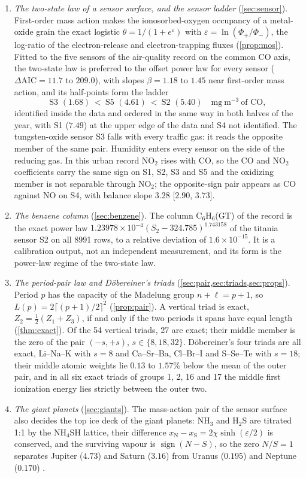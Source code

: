 \documentclass[11pt]{article}
\theoremstyle{definition}\newtheorem{definition}[theorem]{Definition}
\theoremstyle{remark}\newtheorem{remark}[theorem]{Remark}
\begin{document}
\begin{enumerate}[label=(\arabic*)]
\item \emph{The two-state law of a sensor surface, and the sensor ladder} (\cref{sec:sensor}). First-order mass action makes the ionosorbed-oxygen occupancy of a metal-oxide grain the exact logistic $\theta=1/(1+e^{\varepsilon})$ with $\varepsilon=\ln(\Phi_+/\Phi_-)$, the log-ratio of the electron-release and electron-trapping fluxes (\cref{prop:mos}). Fitted to the five sensors of the air-quality record on the common CO axis, the two-state law is preferred to the offset power law for every sensor ($\Delta\mathrm{AIC}=11.7$ to $209.0$), with slopes $\beta=1.18$ to $1.45$ near first-order mass action, and its half-points form the ladder
\[
\text{S3 }(1.68)\ <\ \text{S5 }(4.61)\ <\ \text{S2 }(5.40)\quad\mathrm{mg\ m^{-3}}\ \text{of CO},
\]
identified inside the data and ordered in the same way in both halves of the year, with S1 ($7.49$) at the upper edge of the data and S4 not identified. The tungsten-oxide sensor S3 falls with every traffic gas: it reads the opposite member of the same pair. Humidity enters every sensor on the side of the reducing gas. In this urban record NO$_2$ rises with CO, so the CO and NO$_2$ coefficients carry the same sign on S1, S2, S3 and S5 and the oxidizing member is not separable through NO$_2$; the opposite-sign pair appears as CO against NO on S4, with balance slope $3.28$ [$2.90$, $3.73$].
\item \emph{The benzene column} (\cref{sec:benzene}). The column C$_6$H$_6$(GT) of the record is the exact power law $1.23978\times10^{-4}(S_2-324.785)^{1.743158}$ of the titania sensor S2 on all 8991 rows, to a relative deviation of $1.6\times10^{-15}$. It is a calibration output, not an independent measurement, and its form is the power-law regime of the two-state law.
\item \emph{The period-pair law and D\"obereiner's triads} (\cref{sec:pair,sec:triads,sec:props}). Period $p$ has the capacity of the Madelung group $n+\ell=p+1$, so $L(p)=2\lceil(p+1)/2\rceil^2$ (\cref{prop:pair}). A vertical triad is exact, $Z_2=\frac12(Z_1+Z_3)$, if and only if the two periods it spans have equal length (\cref{thm:exact}). Of the 54 vertical triads, 27 are exact; their middle member is the zero of the pair $(-s,+s)$, $s\in\{8,18,32\}$. D\"obereiner's four triads are all exact, Li--Na--K with $s=8$ and Ca--Sr--Ba, Cl--Br--I and S--Se--Te with $s=18$; their middle atomic weights lie $0.13$ to $1.57\%$ below the mean of the outer pair, and in all six exact triads of groups 1, 2, 16 and 17 the middle first ionization energy lies strictly between the outer two.
\item \emph{The giant planets} (\cref{sec:giants}). The mass-action pair of the sensor surface also decides the top ice deck of the giant planets: NH$_3$ and H$_2$S are titrated 1:1 by the NH$_4$SH lattice, their difference $x_{\mathrm N}-x_{\mathrm S}=2\chi\sinh(\varepsilon/2)$ is conserved, and the surviving vapour is $\operatorname{sign}(N-S)$, so the zero $N/S=1$ separates Jupiter ($4.73$) and Saturn ($3.16$) from Uranus ($0.195$) and Neptune ($0.170$) \cite{Planet}.
\end{enumerate}
\end{document}

